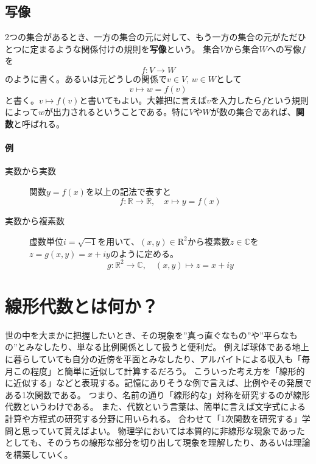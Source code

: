 \documentclass[10pt]{jsarticle}
\numberwithin{equation}{section}%
\begin{document}
\subsection{写像}
2つの集合があるとき、一方の集合の元に対して、もう一方の集合の元がただひとつに定まるような関係付けの規則を{\bf 写像}という。 
集合$V$から集合$W$への写像$f$を
\begin{equation}
  f:V \to W
\end{equation}
のように書く。あるいは元どうしの関係で$v\in V, \, w\in W$として
\begin{equation}
  v \mapsto w= f(v)
\end{equation}
と書く。$v \mapsto f(v)$と書いてもよい。大雑把に言えば$v$を入力したら$f$という規則によって$w$が出力されるということである。特に$V$や$W$が数の集合であれば、{\bf 関数}と呼ばれる。
\paragraph{例}
\begin{description}
  \item[実数から実数] 関数$y=f(x)$を以上の記法で表すと
  \begin{equation}
   f:\mathbb{R}\to\mathbb{R}, \quad x\mapsto y=f(x)
  \end{equation}
 \item[実数から複素数] 虚数単位$i=\sqrt{-1}$を用いて、$(x,y)\in \mathrm{R}^{2}$から複素数$z\in \mathbb{C}$を$z=g(x,y)=x+iy$のように定める。
 \begin{equation}
  g:\mathbb{R}^{2}\to \mathbb{C},\quad (x,y)\mapsto z=x+iy
 \end{equation}
 
\end{description}
\section{線形代数とは何か？}
世の中を大まかに把握したいとき、その現象を''真っ直ぐなもの''や''平らなもの''とみなしたり、単なる比例関係として扱うと便利だ。
例えば球体である地上に暮らしていても自分の近傍を平面とみなしたり、アルバイトによる収入も「毎月この程度」と簡単に近似して計算するだろう。
こういった考え方を「線形的に近似する」などと表現する。記憶にありそうな例で言えば、比例やその発展である1次関数である。
つまり、名前の通り「線形的な」対称を研究するのが線形代数というわけである。
また、代数という言葉は、簡単に言えば文字式による計算や方程式の研究する分野に用いられる。
合わせて「1次関数を研究する」学問と思っていて貰えばよい。
物理学においては本質的に非線形な現象であったとしても、そのうちの線形な部分を切り出して現象を理解したり、あるいは理論を構築していく。
\end{document}
